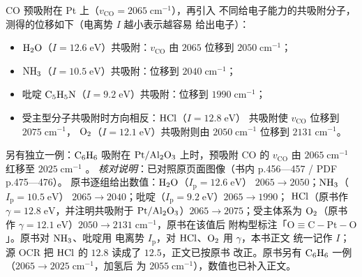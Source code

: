 \begin{obs}
CO 预吸附在 Pt 上（$v_{\mathrm{CO}}=2065\;\mathrm{cm^{-1}}$），再引入
不同给电子能力的共吸附分子，测得的位移如下（电离势 $I$ 越小表示越容易
给出电子）：
\begin{itemize}
  \item $\ce{H2O}$（$I=12.6\;\mathrm{eV}$）共吸附：$v_{\mathrm{CO}}$ 由
        $2065$ 位移到 $2050\;\mathrm{cm^{-1}}$；
  \item $\ce{NH3}$（$I=10.5\;\mathrm{eV}$）共吸附：位移到 $2040\;\mathrm{cm^{-1}}$；
  \item 吡啶 $\ce{C5H5N}$（$I=9.2\;\mathrm{eV}$）共吸附：位移到
        $1990\;\mathrm{cm^{-1}}$；
  \item 受主型分子共吸附时方向相反：$\ce{HCl}$（$I=12.8\;\mathrm{eV}$）
        共吸附使 $v_{\mathrm{CO}}$ 位移到 $2075\;\mathrm{cm^{-1}}$，
        $\ce{O2}$（$I=12.1\;\mathrm{eV}$）共吸附则由 $2050\;\mathrm{cm^{-1}}$ 位移到 $2131\;\mathrm{cm^{-1}}$。
\end{itemize}
另有独立一例：$\ce{C6H6}$ 吸附在 $\ce{Pt/Al2O3}$ 上时，预吸附 CO 的
$v_{\mathrm{CO}}$ 由 $2065\;\mathrm{cm^{-1}}$ 红移至 $2025\;\mathrm{cm^{-1}}$
。
\emph{核对说明}：已对照原页面图像（书内 p.456—457 / PDF p.475—476）。
原书逐组给出数值：$\ce{H2O}$（$I_{\mathrm{p}}=12.6\;\mathrm{eV}$）
$2065\to2050$；$\ce{NH3}$（$I_{\mathrm{p}}=10.5\;\mathrm{eV}$）
$2065\to2040$；吡啶（$I_{\mathrm{p}}=9.2\;\mathrm{eV}$）$2065\to1990$；
$\ce{HCl}$（原书作 $\gamma=12.8\;\mathrm{eV}$，并注明共吸附于
$\ce{Pt/Al2O3}$）$2065\to2075$；受主体系为 $\ce{O2}$（原书作
$\gamma=12.1\;\mathrm{eV}$）$2050\to2131\;\mathrm{cm^{-1}}$，原书在该值后
附构型标注「$\mathrm{O{\equiv}C{-}Pt{-}O}$」。原书对 $\ce{NH3}$、吡啶用
电离势 $I_{\mathrm{p}}$，对 $\ce{HCl}$、$\ce{O2}$ 用 $\gamma$，本书正文
统一记作 $I$；源 OCR 把 $\ce{HCl}$ 的 $12.8$ 读成了 $12.5$，正文已按原书
改正。原书另有 $\ce{C6H6}$ 一例（$2065\to2025\;\mathrm{cm^{-1}}$，加氢后
为 $2055\;\mathrm{cm^{-1}}$），数值也已补入正文。
\end{obs}

